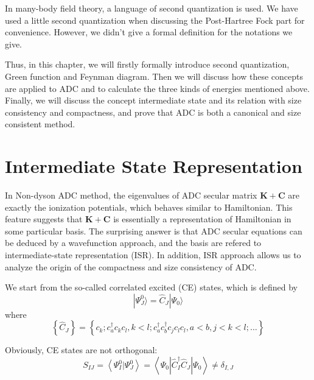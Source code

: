 \documentclass[bachelor, english]{ustcthesis}
\begin{document}
In many-body field theory, a language of second quantization is used.
We have used a little second quantization when discussing the Post-Hartree Fock part for convenience.
However, we didn't give a formal definition for the notations we give.

Thus, in this chapter, we will firstly formally introduce second quantization, Green function and Feynman diagram.
Then we will discuss how these concepts are applied to ADC and to calculate the three kinds of energies mentioned above.
Finally, we will discuss the concept intermediate state and its relation with size consistency and compactness, and prove that ADC is both a canonical and size consistent method.





\section{Intermediate State Representation}

In Non-dyson ADC method, the eigenvalues of ADC secular matrix $\boldsymbol{K}+\boldsymbol{C}$ are exactly the ionization potentials, which behaves similar to Hamiltonian.
This feature suggests that $\boldsymbol{K}+\boldsymbol{C}$ is essentially a representation of Hamiltonian in some particular basis.
The surprising answer is that ADC secular equations can be deduced by a wavefunction approach, and the basis are refered to intermediate-state representation (ISR).
In addition, ISR approach allows us to analyze the origin of the compactness and size consistency of ADC.

We start from the so-called correlated excited (CE) states, which is defined by
\begin{equation}
	| \Psi_{J}^{0} \rangle=\hat{C}_{J} | \Psi_{0} \rangle
\end{equation}
where
\begin{equation}
	\left\{\hat{C}_{J}\right\}=\left\{c_{k} ; c_{a}^{\dagger} c_{k} c_{l}, k<l ; c_{a}^{\dagger} c_{b}^{\dagger} c_{j} c_{l} c_{l}, a<b, j<k<l ; \ldots\right\}
\end{equation}

Obviously, CE states are not orthogonal:
\begin{equation}
	S_{I J}=\left\langle\Psi_{I}^{0} | \Psi_{J}^{0}\right\rangle=\left\langle\Psi_{0}\left|\hat{C}_{I}^{\dagger} \hat{C}_{J}\right| \Psi_{0}\right\rangle \neq \delta_{I, J}
\end{equation}
\end{document}
